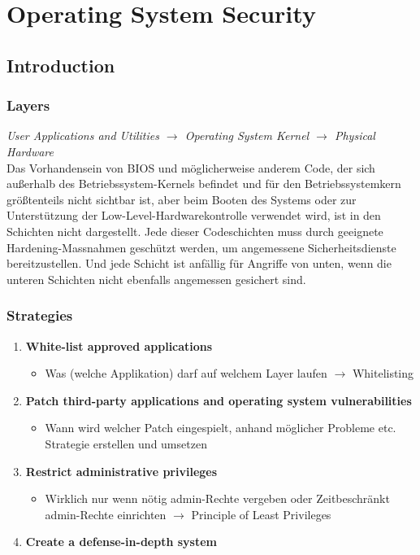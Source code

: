 

\section{Operating System Security}

\subsection{Introduction}

\subsubsection{Layers}
\textit{User Applications and Utilities $\rightarrow$ Operating System Kernel $\rightarrow$ Physical Hardware}\\

Das Vorhandensein von BIOS und möglicherweise anderem Code, der sich außerhalb des Betriebssystem-Kernels befindet und für den Betriebssystemkern größtenteils nicht sichtbar ist, aber beim Booten des Systems oder zur Unterstützung der Low-Level-Hardwarekontrolle verwendet wird, ist in den Schichten nicht dargestellt.
Jede dieser Codeschichten muss durch geeignete Hardening-Massnahmen geschützt werden, um angemessene Sicherheitsdienste bereitzustellen. Und jede Schicht ist anfällig für Angriffe von unten, wenn die unteren Schichten nicht ebenfalls angemessen gesichert sind.

\subsubsection{Strategies}
\begin{enumerate}
    \item \textbf{White-list approved applications}
    \begin{itemize}
        \item Was (welche Applikation) darf auf welchem Layer laufen $\rightarrow$ Whitelisting
    \end{itemize}
    \item \textbf{Patch third-party applications and operating system vulnerabilities}
    \begin{itemize}
        \item Wann wird welcher Patch eingespielt, anhand möglicher Probleme etc. Strategie erstellen und umsetzen
    \end{itemize}
    \item \textbf{Restrict administrative privileges}
    \begin{itemize}
        \item Wirklich nur wenn nötig admin-Rechte vergeben oder Zeitbeschränkt admin-Rechte einrichten $\rightarrow$ Principle of Least Privileges
    \end{itemize}
    \item \textbf{Create a defense-in-depth system}
\end{enumerate}

